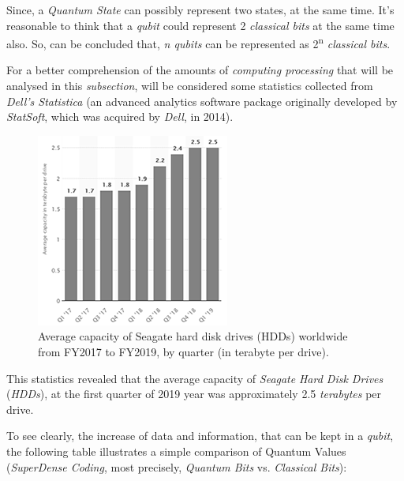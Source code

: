 \documentclass[conference]{IEEEtran}
\begin{document}
\vspace{4pt}

Since, a \textit{Quantum State} can possibly represent two states, at the same time. It's reasonable to think that a \textit{qubit} could represent 2 \textit{classical bits} at the same time also. So, can be concluded that, \textit{n qubits} can be represented as 2\textsuperscript{n} \textit{classical bits}.

\vspace{4pt}

For a better comprehension of the amounts of \textit{computing processing} that will be analysed in this \textit{subsection}, will be considered some statistics collected from \textit{Dell's Statistica} (an advanced analytics software package originally developed by \textit{StatSoft}, which was acquired by \textit{Dell}, in 2014).

\begin{figure}[htbp]
\centerline{\includegraphics{fig4.png}}
\caption{Average capacity of Seagate hard disk drives (HDDs) worldwide from FY2017 to FY2019, by quarter (in terabyte per drive).}
\label{fig}
\end{figure}

This statistics revealed that the average capacity of \textit{Seagate} \textit{Hard Disk Drives} (\textit{HDDs}), at the first quarter of 2019 year was approximately 2.5 \textit{terabytes} per drive.

\vspace{4pt}

To see clearly, the increase of data and information, that can be kept in a \textit{qubit}, the following table illustrates a simple comparison of Quantum Values (\textit{SuperDense Coding}, most precisely, \textit{Quantum Bits} vs. \textit{Classical Bits}):
\end{document}
